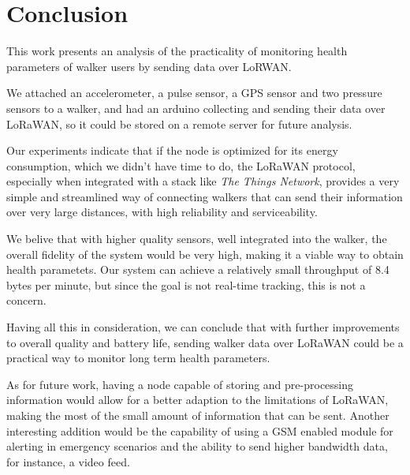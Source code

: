 \chapter{Conclusion}
\label{cha:conclusion}

This work presents an analysis of the practicality of monitoring health parameters of walker users by sending data over LoRWAN. 

We attached an accelerometer, a pulse sensor, a GPS sensor and two pressure sensors to a walker, and had an arduino collecting and sending their data over LoRaWAN, so it could be stored on a remote server for future analysis.

Our experiments indicate that if the node is optimized for its energy consumption, which we didn't have time to do, the LoRaWAN protocol, especially when integrated with a stack like \textit{The Things Network}, provides a very simple and streamlined way of connecting walkers that can send their information over very large distances, with high reliability and serviceability. 

We belive that with higher quality sensors, well integrated into the walker, the overall fidelity of the system would be very high, making it a viable way to obtain health parametets. Our system can achieve a relatively small throughput of 8.4 bytes per minute, but since the goal is not real-time tracking, this is not a concern.

Having all this in consideration, we can conclude that with further improvements to overall quality and battery life, sending walker data over LoRaWAN could be a practical way to monitor long term health parameters.

As for future work, having a node capable of storing and pre-processing information would allow for a better adaption to the limitations of LoRaWAN, making the most of the small amount of information that can be sent. Another interesting addition would be the capability of using a GSM enabled module for alerting in emergency scenarios and the ability to send higher bandwidth data, for instance, a video feed.

